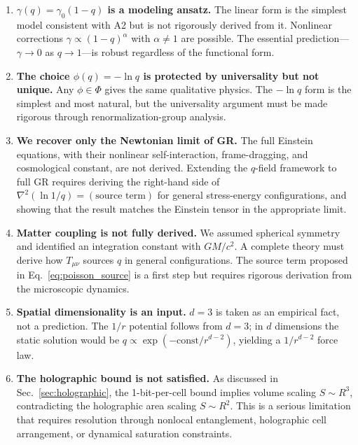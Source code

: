 \documentclass[aps,prd,twocolumn,showpacs,superscriptaddress,preprintnumbers]{revtex4-2}
\begin{document}
\begin{enumerate}
    \item \textbf{$\gamma(q)=\gamma_0(1-q)$ is a modeling ansatz.} The linear form is the simplest model consistent with A2 but is not rigorously derived from it. Nonlinear corrections $\gamma\propto(1-q)^\alpha$ with $\alpha\neq1$ are possible. The essential prediction---$\gamma\to0$ as $q\to1$---is robust regardless of the functional form.

    \item \textbf{The choice $\phi(q)=-\ln q$ is protected by universality but not unique.} Any $\phi\in\Phi$ gives the same qualitative physics. The $-\ln q$ form is the simplest and most natural, but the universality argument must be made rigorous through renormalization-group analysis.

    \item \textbf{We recover only the Newtonian limit of GR.} The full Einstein equations, with their nonlinear self-interaction, frame-dragging, and cosmological constant, are not derived. Extending the $q$-field framework to full GR requires deriving the right-hand side of $\nabla^2(\ln 1/q)=(\text{source term})$ for general stress-energy configurations, and showing that the result matches the Einstein tensor in the appropriate limit.

    \item \textbf{Matter coupling is not fully derived.} We assumed spherical symmetry and identified an integration constant with $GM/c^2$. A complete theory must derive how $T_{\mu\nu}$ sources $q$ in general configurations. The source term proposed in Eq.~\eqref{eq:poisson_source} is a first step but requires rigorous derivation from the microscopic dynamics.

    \item \textbf{Spatial dimensionality is an input.} $d=3$ is taken as an empirical fact, not a prediction. The $1/r$ potential follows from $d=3$; in $d$ dimensions the static solution would be $q\propto\exp(-\text{const}/r^{d-2})$, yielding a $1/r^{d-2}$ force law.

    \item \textbf{The holographic bound is not satisfied.} As discussed in Sec.~\ref{sec:holographic}, the 1-bit-per-cell bound implies volume scaling $S\sim R^3$, contradicting the holographic area scaling $S\sim R^2$. This is a serious limitation that requires resolution through nonlocal entanglement, holographic cell arrangement, or dynamical saturation constraints.


\end{enumerate}
\end{document}
